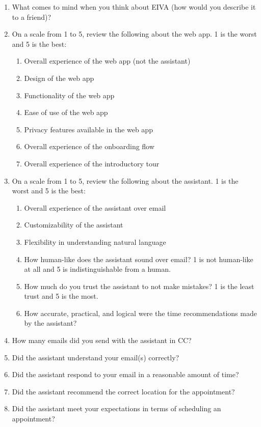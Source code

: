 \documentclass{article}
\begin{document}
\begin{enumerate}
	\item What comes to mind when you think about EIVA (how would you describe it to a friend)?
	\item On a scale from 1 to 5, review the following about the web app. 1 is the worst and 5 is the best:
	      \begin{enumerate}
	      	\item Overall experience of the web app (not the assistant)
	      	\item Design of the web app
	      	\item Functionality of the web app
	      	\item Ease of use of the web app
	      	\item Privacy features available in the web app
	      	\item Overall experience of the onboarding flow
	      	\item Overall experience of the introductory tour
	      \end{enumerate}
	\item On a scale from 1 to 5, review the following about the assistant. 1 is the worst and 5 is the best:
	      \begin{enumerate}
	      	\item Overall experience of the assistant over email
	      	\item Customizability of the assistant
	      	\item Flexibility in understanding natural language
	      	\item How human-like does the assistant sound over email? 1 is not human-like at all and 5 is indistinguishable from a human.
	      	\item How much do you trust the assistant to not make mistakes? 1 is the least trust and 5 is the most.
	      	\item How accurate, practical, and logical were the time recommendations made by the assistant?
	      \end{enumerate}
	\item How many emails did you send with the assistant in CC?
	\item Did the assistant understand your email(s) correctly?
	\item Did the assistant respond to your email in a reasonable amount of time?
	\item Did the assistant recommend the correct location for the appointment?
	\item Did the assistant meet your expectations in terms of scheduling an appointment?

\end{enumerate}
\end{document}
